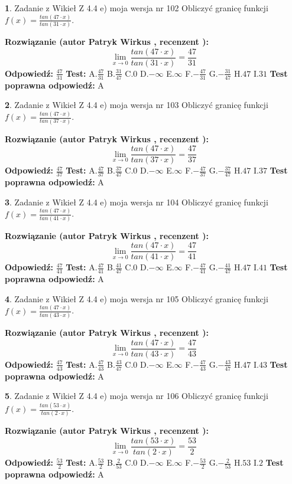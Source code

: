 \documentclass[12pt, a4paper]{article}
\theoremstyle{definition} %
\newtheorem{zad}{}
\newcommand{\zadStart}[1]{\begin{zad}#1\newline}
\newcommand{\zadStop}{\end{zad}}
\newcommand{\rozwStart}[2]{\noindent \textbf{Rozwiązanie (autor #1 , recenzent #2): }\newline}
\newcommand{\rozwStop}{\newline}
\newcommand{\odpStart}{\noindent \textbf{Odpowiedź:}\newline}
\newcommand{\odpStop}{\newline}
\newcommand{\testStart}{\noindent \textbf{Test:}\newline}
\newcommand{\testStop}{\newline}
\newcommand{\kluczStart}{\noindent \textbf{Test poprawna odpowiedź:}\newline}
\newcommand{\kluczStop}{\newline}
\begin{document}
\zadStart{Zadanie z Wikieł Z 4.4 e) moja wersja nr 102}
Obliczyć granicę funkcji $f(x)=\frac{tan(47\cdot x)}{tan(31\cdot x)}$.
\zadStop
\rozwStart{Patryk Wirkus}{}
$$\lim\limits_{x\to 0}\frac{tan(47\cdot x)}{tan(31\cdot x)}=
\frac{47}{31}$$
\rozwStop
\odpStart
$\frac{47}{31}$
\odpStop
\testStart
A.$\frac{47}{31}$
B.$\frac{31}{47}$
C.$0$
D.$-\infty$
E.$\infty$
F.$-\frac{47}{31}$
G.$-\frac{31}{47}$
H.$47$
I.$31$
\testStop
\kluczStart
A
\kluczStop



\zadStart{Zadanie z Wikieł Z 4.4 e) moja wersja nr 103}
Obliczyć granicę funkcji $f(x)=\frac{tan(47\cdot x)}{tan(37\cdot x)}$.
\zadStop
\rozwStart{Patryk Wirkus}{}
$$\lim\limits_{x\to 0}\frac{tan(47\cdot x)}{tan(37\cdot x)}=
\frac{47}{37}$$
\rozwStop
\odpStart
$\frac{47}{37}$
\odpStop
\testStart
A.$\frac{47}{37}$
B.$\frac{37}{47}$
C.$0$
D.$-\infty$
E.$\infty$
F.$-\frac{47}{37}$
G.$-\frac{37}{47}$
H.$47$
I.$37$
\testStop
\kluczStart
A
\kluczStop



\zadStart{Zadanie z Wikieł Z 4.4 e) moja wersja nr 104}
Obliczyć granicę funkcji $f(x)=\frac{tan(47\cdot x)}{tan(41\cdot x)}$.
\zadStop
\rozwStart{Patryk Wirkus}{}
$$\lim\limits_{x\to 0}\frac{tan(47\cdot x)}{tan(41\cdot x)}=
\frac{47}{41}$$
\rozwStop
\odpStart
$\frac{47}{41}$
\odpStop
\testStart
A.$\frac{47}{41}$
B.$\frac{41}{47}$
C.$0$
D.$-\infty$
E.$\infty$
F.$-\frac{47}{41}$
G.$-\frac{41}{47}$
H.$47$
I.$41$
\testStop
\kluczStart
A
\kluczStop



\zadStart{Zadanie z Wikieł Z 4.4 e) moja wersja nr 105}
Obliczyć granicę funkcji $f(x)=\frac{tan(47\cdot x)}{tan(43\cdot x)}$.
\zadStop
\rozwStart{Patryk Wirkus}{}
$$\lim\limits_{x\to 0}\frac{tan(47\cdot x)}{tan(43\cdot x)}=
\frac{47}{43}$$
\rozwStop
\odpStart
$\frac{47}{43}$
\odpStop
\testStart
A.$\frac{47}{43}$
B.$\frac{43}{47}$
C.$0$
D.$-\infty$
E.$\infty$
F.$-\frac{47}{43}$
G.$-\frac{43}{47}$
H.$47$
I.$43$
\testStop
\kluczStart
A
\kluczStop



\zadStart{Zadanie z Wikieł Z 4.4 e) moja wersja nr 106}
Obliczyć granicę funkcji $f(x)=\frac{tan(53\cdot x)}{tan(2\cdot x)}$.
\zadStop
\rozwStart{Patryk Wirkus}{}
$$\lim\limits_{x\to 0}\frac{tan(53\cdot x)}{tan(2\cdot x)}=
\frac{53}{2}$$
\rozwStop
\odpStart
$\frac{53}{2}$
\odpStop
\testStart
A.$\frac{53}{2}$
B.$\frac{2}{53}$
C.$0$
D.$-\infty$
E.$\infty$
F.$-\frac{53}{2}$
G.$-\frac{2}{53}$
H.$53$
I.$2$
\testStop
\kluczStart
A
\kluczStop
\end{document}

